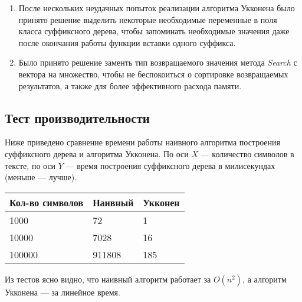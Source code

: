 \documentclass[12pt]{article}
\begin{document}
    \begin{enumerate}
    \item После нескольких неудачных попыток реализации алгоритма Укконена было
    принято решение выделить некоторые необходимые переменные в поля класса 
    суффиксного дерева, чтобы запоминать необходимые значения даже после 
    окончания работы функции вставки одного суффикса.
    \item Было принято решение заменть тип возвращаемого значения метода 
    \textit{Search} с вектора на множество, чтобы не беспокоиться о сортировке 
    возвращаемых результатов, а также для более эффективного расхода памяти. 
    \end{enumerate}


    \subsection*{Тест производительности}

    Ниже приведено сравнение времени работы наивного алгоритма построения 
    суффиксного дерева и алгоритма Укконена. По оси $X$ — количество символов в
    тексте, по оси $Y$ — время построения суффиксного дерева в милисекундах 
    (меньше — лучше).
    

    \begin{tabular}{ | l | l | l | }
        \hline
            Кол-во символов & Наивный & Укконен \\ \hline
            1000            & 72      & 1       \\
            10000           & 7028    & 16      \\
            100000          & 911808  & 185    \\
        \hline
    \end{tabular}

    Из тестов ясно видно, что наивный алгоритм работает за $O(n^2)$, а алгоритм 
    Укконена — за линейное время.
\end{document}
